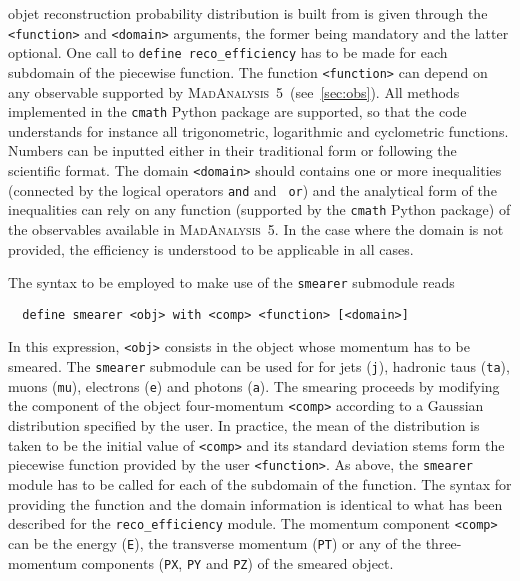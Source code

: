 \documentclass[a4paper]{article}
\newcommand{\MA}{\textsc{MadAnalysis}~5}
\begin{document}
objet reconstruction probability distribution is built from is given through the
{\tt <function>} and {\tt <domain>} arguments, the former being mandatory and
the latter optional. One call to {\tt define reco\_efficiency} has to be
made for each subdomain of the piecewise function. The function {\tt <function>}
can depend on any observable supported by \MA\ (see~\autoref{sec:obs}). All
methods implemented in the {\tt cmath} {\sc Python} package are supported, so
that the code understands for instance all trigonometric, logarithmic and
cyclometric functions. Numbers can be inputted either in their traditional form
or following the scientific format. The domain {\tt <domain>} should contains
one or more inequalities (connected by the logical operators {\tt and} and {\tt
or}) and the analytical form of the inequalities can rely on any function
(supported by the {\tt cmath} {\sc Python} package) of the observables available
in \MA. In the case where the domain is not provided, the efficiency is
understood to be applicable in all cases.

\noindent The syntax to be employed to make use of the \verb+smearer+ submodule
reads
{\color{ao} \begin{verbatim}
  define smearer <obj> with <comp> <function> [<domain>]
\end{verbatim}}
\noindent In this expression, \verb+<obj>+ consists in the object whose momentum
has to be smeared. The {\tt smearer} submodule can be used for for jets
(\verb+j+), hadronic taus (\verb+ta+), muons (\verb+mu+), electrons (\verb+e+)
and photons (\verb+a+). The smearing proceeds by modifying the component of the
object four-momentum {\tt <comp>} according to a Gaussian distribution specified
by the user. In practice, the mean of the distribution is taken to be the
initial value of {\tt <comp>} and its standard deviation stems form the
piecewise function provided by the user {\tt <function>}. As above,
the {\tt smearer} module has to be called for each of the subdomain of the
function. The syntax for providing the function and the domain information is
identical to what has been described for the {\tt reco\_efficiency} module. The
momentum component {\tt <comp>} can be the energy (\verb|E|), the transverse
momentum (\verb|PT|) or any of the three-momentum components (\verb+PX+,
\verb+PY+ and \verb+PZ+) of the smeared object.
\end{document}
